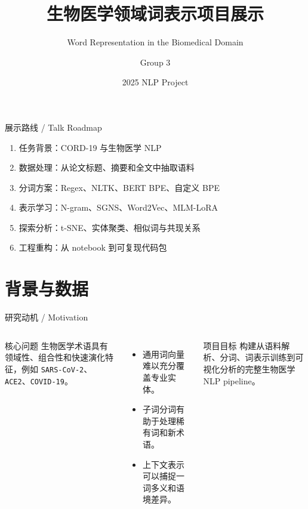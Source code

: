\documentclass[aspectratio=169,10pt]{ctexbeamer}
\title{生物医学领域词表示项目展示}
\subtitle{Word Representation in the Biomedical Domain}
\author{Group 3}
\institute{Imperial College London Data Science and AI Winter School}
\date{2025 NLP Project}
\begin{document}
\begin{frame}
  \titlepage
\end{frame}

\begin{frame}{展示路线 / Talk Roadmap}
  \begin{enumerate}
    \item 任务背景：CORD-19 与生物医学 NLP
    \item 数据处理：从论文标题、摘要和全文中抽取语料
    \item 分词方案：Regex、NLTK、BERT BPE、自定义 BPE
    \item 表示学习：N-gram、SGNS、Word2Vec、MLM-LoRA
    \item 探索分析：t-SNE、实体聚类、相似词与共现关系
    \item 工程重构：从 notebook 到可复现代码包
  \end{enumerate}
\end{frame}

\section{背景与数据}

\begin{frame}{研究动机 / Motivation}
  \begin{columns}[T]
    \begin{block}{核心问题}
      生物医学术语具有领域性、组合性和快速演化特征，例如 \texttt{SARS-CoV-2}、\texttt{ACE2}、\texttt{COVID-19}。
    \end{block}
    \begin{itemize}
      \item 通用词向量难以充分覆盖专业实体。
      \item 子词分词有助于处理稀有词和新术语。
      \item 上下文表示可以捕捉一词多义和语境差异。
    \end{itemize}
    \begin{block}{项目目标}
      构建从语料解析、分词、词表示训练到可视化分析的完整生物医学 NLP pipeline。
    \end{block}
  \end{columns}
\end{frame}
\end{document}
